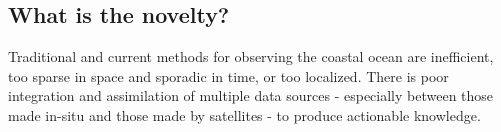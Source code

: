 



\vspace*{-0.2cm}
\subsection{What is the novelty?}

Traditional  and  current  methods  for  observing  the  coastal
ocean  are  inefficient,  too sparse in space and sporadic in time, or
too localized. There is poor integration and assimilation of multiple
data sources - especially between those made in-situ and those made by
satellites - to produce actionable knowledge.


